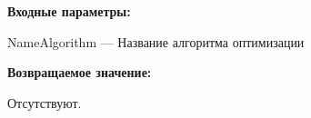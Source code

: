 \textbf{Входные параметры:}

NameAlgorithm --- Название алгоритма оптимизации

\textbf{Возвращаемое значение:}

Отсутствуют.